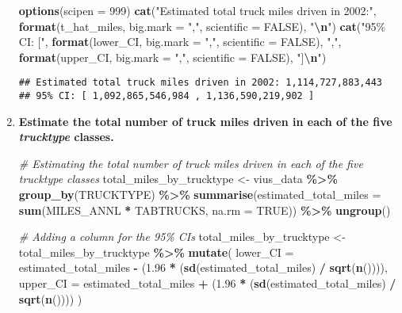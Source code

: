 \documentclass[]{article}
\newenvironment{Shaded}{\begin{snugshade}}{\end{snugshade}}
\newcommand{\AttributeTok}[1]{\textcolor[rgb]{0.13,0.29,0.53}{#1}}
\newcommand{\CommentTok}[1]{\textcolor[rgb]{0.56,0.35,0.01}{\textit{#1}}}
\newcommand{\ConstantTok}[1]{\textcolor[rgb]{0.56,0.35,0.01}{#1}}
\newcommand{\DecValTok}[1]{\textcolor[rgb]{0.00,0.00,0.81}{#1}}
\newcommand{\FloatTok}[1]{\textcolor[rgb]{0.00,0.00,0.81}{#1}}
\newcommand{\FunctionTok}[1]{\textcolor[rgb]{0.13,0.29,0.53}{\textbf{#1}}}
\newcommand{\NormalTok}[1]{#1}
\newcommand{\OtherTok}[1]{\textcolor[rgb]{0.56,0.35,0.01}{#1}}
\newcommand{\SpecialCharTok}[1]{\textcolor[rgb]{0.81,0.36,0.00}{\textbf{#1}}}
\newcommand{\StringTok}[1]{\textcolor[rgb]{0.31,0.60,0.02}{#1}}
\begin{document}
\begin{enumerate}[label=(\alph*)]
\begin{Shaded}
\begin{Highlighting}[]
\FunctionTok{options}\NormalTok{(}\AttributeTok{scipen =} \DecValTok{999}\NormalTok{)}
\FunctionTok{cat}\NormalTok{(}\StringTok{"Estimated total truck miles driven in 2002:"}\NormalTok{, }\FunctionTok{format}\NormalTok{(t\_hat\_miles, }
    \AttributeTok{big.mark =} \StringTok{","}\NormalTok{, }\AttributeTok{scientific =} \ConstantTok{FALSE}\NormalTok{), }\StringTok{"}\SpecialCharTok{\textbackslash{}n}\StringTok{"}\NormalTok{)}
\FunctionTok{cat}\NormalTok{(}\StringTok{"95\% CI: ["}\NormalTok{, }\FunctionTok{format}\NormalTok{(lower\_CI, }\AttributeTok{big.mark =} \StringTok{","}\NormalTok{, }\AttributeTok{scientific =} \ConstantTok{FALSE}\NormalTok{),}
    \StringTok{","}\NormalTok{, }\FunctionTok{format}\NormalTok{(upper\_CI, }\AttributeTok{big.mark =} \StringTok{","}\NormalTok{, }\AttributeTok{scientific =} \ConstantTok{FALSE}\NormalTok{), }\StringTok{"]}\SpecialCharTok{\textbackslash{}n}\StringTok{"}\NormalTok{)}
\end{Highlighting}
\end{Shaded}

\begin{verbatim}
## Estimated total truck miles driven in 2002: 1,114,727,883,443
## 95% CI: [ 1,092,865,546,984 , 1,136,590,219,902 ]
\end{verbatim}

\item \textbf{Estimate the total number of truck miles driven in each of the five \textit{trucktype} classes.}


\begin{Shaded}
\begin{Highlighting}[]
\CommentTok{\# Estimating the total number of truck miles driven in each of the five} 
\CommentTok{trucktype classes}
\NormalTok{total\_miles\_by\_trucktype }\OtherTok{\textless{}{-}}\NormalTok{ vius\_data }\SpecialCharTok{\%\textgreater{}\%}
  \FunctionTok{group\_by}\NormalTok{(TRUCKTYPE) }\SpecialCharTok{\%\textgreater{}\%}
  \FunctionTok{summarise}\NormalTok{(}\AttributeTok{estimated\_total\_miles =} \FunctionTok{sum}\NormalTok{(MILES\_ANNL }\SpecialCharTok{*}\NormalTok{ TABTRUCKS, }
    \AttributeTok{na.rm =} \ConstantTok{TRUE}\NormalTok{)) }\SpecialCharTok{\%\textgreater{}\%}
  \FunctionTok{ungroup}\NormalTok{()}


\CommentTok{\# Adding a column for the 95\% CIs}
\NormalTok{total\_miles\_by\_trucktype }\OtherTok{\textless{}{-}}\NormalTok{ total\_miles\_by\_trucktype }\SpecialCharTok{\%\textgreater{}\%}
  \FunctionTok{mutate}\NormalTok{(}
    \AttributeTok{lower\_CI =}\NormalTok{ estimated\_total\_miles }\SpecialCharTok{{-}}\NormalTok{ (}\FloatTok{1.96} \SpecialCharTok{*}\NormalTok{ (}\FunctionTok{sd}\NormalTok{(estimated\_total\_miles) }\SpecialCharTok{/}
        \FunctionTok{sqrt}\NormalTok{(}\FunctionTok{n}\NormalTok{()))),}
    \AttributeTok{upper\_CI =}\NormalTok{ estimated\_total\_miles }\SpecialCharTok{+}\NormalTok{ (}\FloatTok{1.96} \SpecialCharTok{*}\NormalTok{ (}\FunctionTok{sd}\NormalTok{(estimated\_total\_miles) }\SpecialCharTok{/}
        \FunctionTok{sqrt}\NormalTok{(}\FunctionTok{n}\NormalTok{())))}
\NormalTok{  )}


\end{Highlighting}
\end{Shaded}
\end{enumerate}
\end{document}
